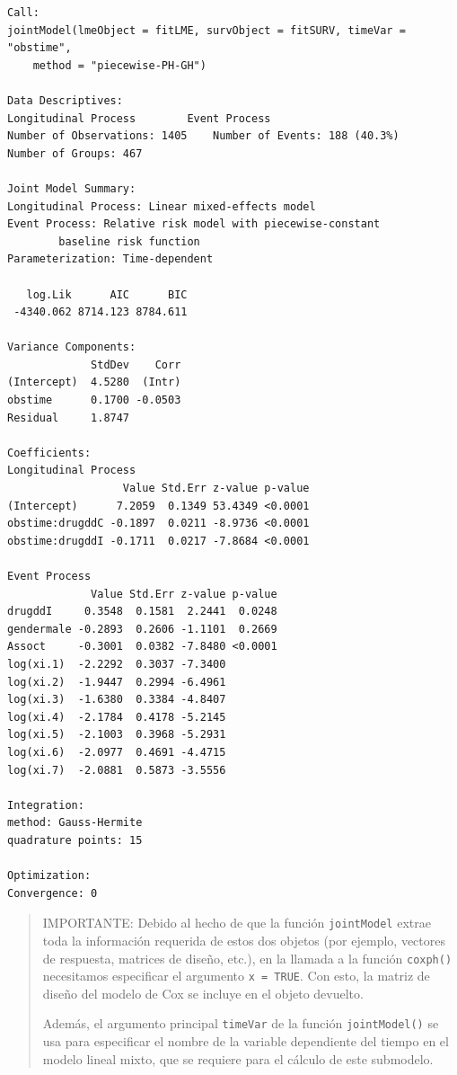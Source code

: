 \documentclass[
]{book}
\begin{document}
\begin{verbatim}
Call:
jointModel(lmeObject = fitLME, survObject = fitSURV, timeVar = "obstime", 
    method = "piecewise-PH-GH")

Data Descriptives:
Longitudinal Process        Event Process
Number of Observations: 1405    Number of Events: 188 (40.3%)
Number of Groups: 467

Joint Model Summary:
Longitudinal Process: Linear mixed-effects model
Event Process: Relative risk model with piecewise-constant
        baseline risk function
Parameterization: Time-dependent 

   log.Lik      AIC      BIC
 -4340.062 8714.123 8784.611

Variance Components:
             StdDev    Corr
(Intercept)  4.5280  (Intr)
obstime      0.1700 -0.0503
Residual     1.8747        

Coefficients:
Longitudinal Process
                  Value Std.Err z-value p-value
(Intercept)      7.2059  0.1349 53.4349 <0.0001
obstime:drugddC -0.1897  0.0211 -8.9736 <0.0001
obstime:drugddI -0.1711  0.0217 -7.8684 <0.0001

Event Process
             Value Std.Err z-value p-value
drugddI     0.3548  0.1581  2.2441  0.0248
gendermale -0.2893  0.2606 -1.1101  0.2669
Assoct     -0.3001  0.0382 -7.8480 <0.0001
log(xi.1)  -2.2292  0.3037 -7.3400        
log(xi.2)  -1.9447  0.2994 -6.4961        
log(xi.3)  -1.6380  0.3384 -4.8407        
log(xi.4)  -2.1784  0.4178 -5.2145        
log(xi.5)  -2.1003  0.3968 -5.2931        
log(xi.6)  -2.0977  0.4691 -4.4715        
log(xi.7)  -2.0881  0.5873 -3.5556        

Integration:
method: Gauss-Hermite
quadrature points: 15 

Optimization:
Convergence: 0 
\end{verbatim}

\begin{quote}
IMPORTANTE: Debido al hecho de que la función \texttt{jointModel} extrae toda la información requerida de estos dos objetos (por ejemplo, vectores de respuesta, matrices de diseño, etc.), en la llamada a la función \texttt{coxph()} necesitamos especificar el argumento \texttt{x\ =\ TRUE}. Con esto, la matriz de diseño del modelo de Cox se incluye en el objeto devuelto.

Además, el argumento principal \texttt{timeVar} de la función \texttt{jointModel()} se usa para especificar el nombre de la variable dependiente del tiempo en el modelo lineal mixto, que se requiere para el cálculo de este submodelo.
\end{quote}
\end{document}
